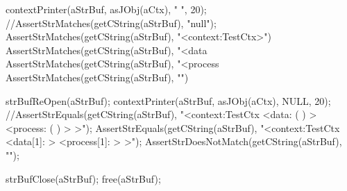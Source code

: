   contextPrinter(aStrBuf, asJObj(aCtx), "  ", 20);
  //AssertStrMatches(getCString(aStrBuf), "null");
  AssertStrMatches(getCString(aStrBuf), "<context:TestCtx>")
  AssertStrMatches(getCString(aStrBuf), "<data%
  AssertStrMatches(getCString(aStrBuf), "<process%
  AssertStrMatches(getCString(aStrBuf), "\n")

  strBufReOpen(aStrBuf);
  contextPrinter(aStrBuf, asJObj(aCtx), NULL, 20);
  //AssertStrEquals(getCString(aStrBuf), "<context:TestCtx   <data: (  )  > <process: (  )  > >");
  AssertStrEquals(getCString(aStrBuf), "<context:TestCtx   <data[1]: > <process[1]: > >");
  AssertStrDoesNotMatch(getCString(aStrBuf), "\n");
  
  strBufClose(aStrBuf);
  free(aStrBuf);
\stopCTest
\stopTestCase
\stopTestSuite